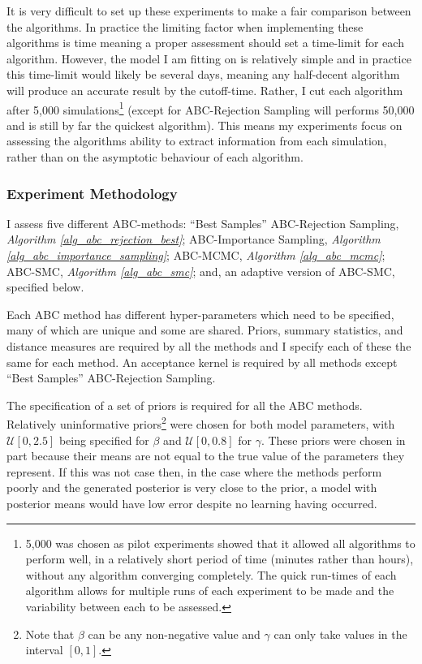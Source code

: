 \documentclass[11pt,a4paper]{article}
\theoremstyle{break}
\begin{document}
  \par It is very difficult to set up these experiments to make a fair comparison between the algorithms. In practice the limiting factor when implementing these algorithms is time meaning a proper assessment should set a time-limit for each algorithm. However, the model I am fitting on is relatively simple and in practice this time-limit would likely be several days, meaning any half-decent algorithm will produce an accurate result by the cutoff-time. Rather, I cut each algorithm after 5,000 simulations\footnote{5,000 was chosen as pilot experiments showed that it allowed all algorithms to perform well, in a relatively short period of time (minutes rather than hours), without any algorithm converging completely. The quick run-times of each algorithm allows for multiple runs of each experiment to be made and the variability between each to be assessed.} (except for ABC-Rejection Sampling will performs 50,000 and is still by far the quickest algorithm). This means my experiments focus on assessing the algorithms ability to extract information from each simulation, rather than on the asymptotic behaviour of each algorithm.

\subsubsection*{Experiment Methodology}

  \par I assess five different ABC-methods: ``Best Samples'' ABC-Rejection Sampling, \textit{Algorithm \ref{alg_abc_rejection_best}}; ABC-Importance Sampling, \textit{Algorithm \ref{alg_abc_importance_sampling}}; ABC-MCMC, \textit{Algorithm \ref{alg_abc_mcmc}}; ABC-SMC, \textit{Algorithm \ref{alg_abc_smc}}; and, an adaptive version of ABC-SMC, specified below.

  \par Each ABC method has different hyper-parameters which need to be specified, many of which are unique and some are shared. Priors, summary statistics, and distance measures are required by all the methods and I specify each of these the same for each method. An acceptance kernel is required by all methods except ``Best Samples'' ABC-Rejection Sampling.

  \par The specification of a set of priors is required for all the ABC methods. Relatively uninformative priors\footnote{Note that $\beta$ can be any non-negative value and $\gamma$ can only take values in the interval $[0,1]$.} were chosen for both model parameters, with $\mathcal{U}[0,2.5]$ being specified for $\beta$ and $\mathcal{U}[0,0.8]$ for $\gamma$. These priors were chosen in part because their means are not equal to the true value of the parameters they represent. If this was not case then, in the case where the methods perform poorly and the generated posterior is very close to the prior, a model with posterior means would have low error despite no learning having occurred.
\end{document}
